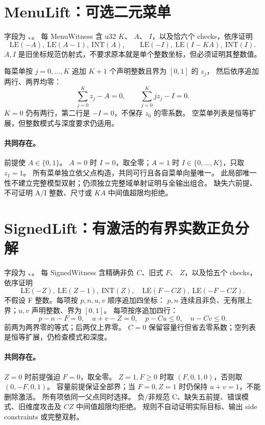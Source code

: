 \section{MenuLift：可选二元菜单}
\label{ins:menu-lift}

字段为 、。
每 MenuWitness 含 u32  $K$、 $A$、
 $I$，以及恰六个 checks，依序证明
\[
 \mathrm{LE}(-A),\ \mathrm{LE}(A-1),\ \mathrm{INT}(A),\qquad
 \mathrm{LE}(-I),\ \mathrm{LE}(I-KA),\ \mathrm{INT}(I).
\]
$A,I$ 是旧坐标规范仿射式，不要求原本就是单个整数坐标，但必须证明其整数值。

每菜单按 $j=0,\ldots,K$ 追加 $K+1$ 个声明整数且界为 $[0,1]$ 的 $z_j$，
然后依序追加两行、两界均零：
\[
 \sum_{j=0}^Kz_j-A=0,\qquad \sum_{j=0}^Kjz_j-I=0.
\]
$K=0$ 仍有两行，第二行是 $-I=0$，不保存 $z_0$ 的零系数。
空菜单列表是恒等扩展，但整数模式与深度要求仍适用。

\paragraph{共同存在。}前提使 $A\in\{0,1\}$。
$A=0$ 时 $I=0$，取全零；$A=1$ 时 $I\in\{0,\ldots,K\}$，只取 $z_I=1$。
所有菜单独立依父点构造，共同可行且各自菜单向量唯一。
此局部唯一性不建立完整模型双射；仍须独立完整域单射证明与全输出组合。
缺失六前提、不可证明 A/I 整数、尺寸或 $KA$ 中间值超限均拒绝。

\section{SignedLift：有激活的有界实数正负分解}
\label{ins:signed-lift}

字段为 、。
每 SignedWitness 含精确非负  $C$、旧式  $F$、
 $Z$，以及恰五个 checks，依序证明
\[
 \mathrm{LE}(-Z),\ \mathrm{LE}(Z-1),\ \mathrm{INT}(Z),\quad
 \mathrm{LE}(F-CZ),\ \mathrm{LE}(-F-CZ).
\]
不假设 F 整数。每项按 $p,n,u,v$ 顺序追加四坐标：
$p,n$ 连续且非负、无有限上界；$u,v$ 声明整数、界为 $[0,1]$。
每项按序追加四行：
\[
 p-n-F=0,\quad u+v-Z=0,\quad p-Cu\le0,\quad n-Cv\le0.
\]
前两为两界零的等式；后两仅上界零。
$C=0$ 保留容量行但省去零系数；空列表是恒等扩展，仍检查模式和深度。

\paragraph{共同存在。}$Z=0$ 时前提强迫 $F=0$，取全零。
$Z=1,F\ge0$ 时取 $(F,0,1,0)$，否则取 $(0,-F,0,1)$。
容量前提保证全部界；当 $F=0,Z=1$ 时仍保持 $u+v=1$，不能删除激活。
所有项依同一父点同时选择。
负/非规范 C、缺失五前提、错误模式、旧维度攻击及 $CZ$ 中间值超限均拒绝。
规则不自动证明实际目标、输出 side constraints 或完整双射。


